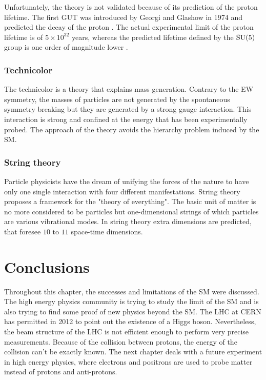       Unfortunately, the theory is not validated because of its prediction of the proton lifetime. 
      The first \gls{GUT} was introduced by Georgi and Glashow in 1974 and predicted the decay of the proton \cite{Georgi:1974sy}. 
      The actual experimental limit of the proton lifetime is of $5 \times 10^{32}$ years, whereas the predicted lifetime defined by the $\rm{SU}(5)$ group is one order of magnitude lower \cite{Agashe:2014kda}.

      \subsubsection{Technicolor}

      The technicolor is a theory that explains mass generation.
      Contrary to the \gls{EW} symmetry, the masses of particles are not generated by the spontaneous symmetry breaking but they are generated by a strong gauge interaction.
      This interaction is strong and confined at the energy that has been experimentally probed.
      The approach of the theory avoids the hierarchy problem induced by the \gls{SM}.
      
      \subsubsection{String theory}

      Particle physicists have the dream of unifying the forces of the nature to have only one single interaction with four different manifestations.
      String theory proposes a framework for the "theory of everything".
      The basic unit of matter is no more considered to be particles but one-dimensional strings of which particles are various vibrational modes.
      In string theory extra dimensions are predicted, that foresee $10$ to $11$ space-time dimensions.

  \section{Conclusions}

  Throughout this chapter, the successes and limitations of the \gls{SM} were discussed.
  The high energy physics community is trying to study the limit of the \gls{SM} and is also trying to find some proof of new physics beyond the \gls{SM}.
  The \gls{LHC} at CERN has permitted in 2012 to point out the existence of a Higgs boson.  
  Nevertheless, the beam structure of the \gls{LHC} is not efficient enough to perform very precise measurements.
  Because of the collision between protons, the energy of the collision can't be exactly known.
  The next chapter deals with a future experiment in high energy physics, where electrons and positrons are used to probe matter instead of protons and anti-protons.

